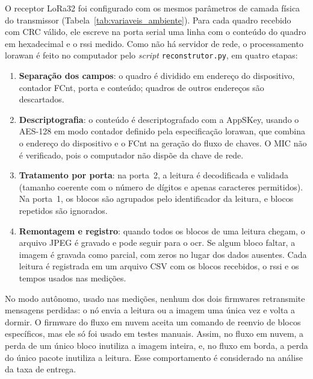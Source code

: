 O receptor LoRa32 foi configurado com os mesmos parâmetros de camada física do
transmissor (Tabela~\ref{tab:variaveis_ambiente}). Para cada quadro recebido com CRC
válido, ele escreve na porta serial uma linha com o conteúdo do quadro em hexadecimal e o
\gls{rssi} medido. Como não há servidor de rede, o processamento \gls{lorawan} é feito no
computador pelo \textit{script} \texttt{reconstrutor.py}, em quatro etapas:

\begin{enumerate}
    \item \textbf{Separação dos campos}: o quadro é dividido em endereço do dispositivo,
    contador FCnt, porta e conteúdo; quadros de outros endereços são descartados.
    \item \textbf{Descriptografia}: o conteúdo é descriptografado com a AppSKey, usando o
    AES-128 em modo contador definido pela especificação \gls{lorawan}, que combina o
    endereço do dispositivo e o FCnt na geração do fluxo de chaves. O MIC não é verificado,
    pois o computador não dispõe da chave de rede.
    \item \textbf{Tratamento por porta}: na porta~2, a leitura é decodificada e validada
    (tamanho coerente com o número de dígitos e apenas caracteres permitidos). Na porta~1,
    os blocos são agrupados pelo identificador da leitura, e blocos repetidos são
    ignorados.
    \item \textbf{Remontagem e registro}: quando todos os blocos de uma leitura chegam, o
    arquivo JPEG é gravado e pode seguir para o \gls{ocr}. Se algum bloco faltar, a imagem
    é gravada como parcial, com zeros no lugar dos dados ausentes. Cada leitura é
    registrada em um arquivo CSV com os blocos recebidos, o \gls{rssi} e os tempos usados nas
    medições.
\end{enumerate}

No modo autônomo, usado nas medições, nenhum dos dois firmwares retransmite mensagens
perdidas: o nó envia a leitura ou a imagem uma única vez e volta a dormir. O firmware do
fluxo em nuvem aceita um comando de reenvio de blocos específicos, mas ele só foi usado em
testes manuais. Assim, no fluxo em nuvem, a perda de um único bloco inutiliza a imagem
inteira, e, no fluxo em borda, a perda do único pacote inutiliza a leitura. Esse
comportamento é considerado na análise da taxa de entrega.
